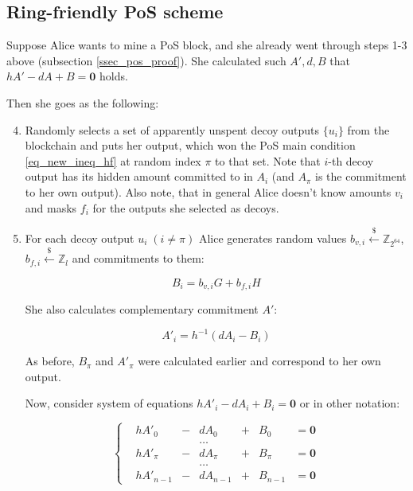 \documentclass{article}
\numberwithin{figure}{section}
\begin{document}
\subsection{Ring-friendly PoS scheme}

Suppose Alice wants to mine a PoS block, and she already went through steps 1-3 above (subsection \ref{ssec_pos_proof}). She calculated such $A', d, B$ that $ hA' - dA + B = \mathbf{0} $ holds.

Then she goes as the following:
\begin{enumerate}
    \setcounter{enumi}{3} 
    \item Randomly selects a set of apparently unspent decoy outputs $\{u_i\}$ from the blockchain and puts her output, which won the PoS main condition \eqref{eq_new_ineq_hf} at random index $\pi$ to that set. Note that $i$-th decoy output has its hidden amount committed to in $A_i$ (and $A_\pi$ is the commitment to her own output). Also note, that in general Alice doesn't know amounts $v_i$ and masks $f_i$ for the outputs she selected as decoys.
    
    \item For each decoy output $u_i \; (i \neq \pi)$ Alice generates random values $b_{v,i} \stackrel{\$}{\leftarrow} \mathbb{Z}_{2^{64}}$, $b_{f,i} \stackrel{\$}{\leftarrow} \mathbb{Z}_l$ and commitments to them: 
    
    \begin{equation} \label{rfpos_Bi}
        B_i = b_{v,i} G + b_{f,i} H
    \end{equation} 
    
    She also calculates complementary commitment $A'$:
    
    \begin{equation} \label{rfpos_Aprimei}
        A'_i = h^{-1}(dA_i - B_i)
    \end{equation}
    
    As before, $B_\pi$ and $A'_\pi$ were calculated earlier and correspond to her own output.
    
    Now, consider system of equations $hA'_i - dA_i + B_i = \mathbf{0}$ or in other notation:
    
    \begin{equation} \label{rfpos_sys}
    \left\{ \begin{aligned} 
        &h A'_0 &- &d A_0 &+ &B_0 &= \mathbf{0} \\
        &&& \dots &&& \\
        &h A'_\pi &- &d A_\pi &+  &B_\pi &= \mathbf{0} \\
        &&& \dots &&& \\
        &h A'_{n-1} &- &d A_{n-1} &+ &B_{n-1} &= \mathbf{0}
    \end{aligned} \right.
    \end{equation}
    

\end{enumerate}
\end{document}
